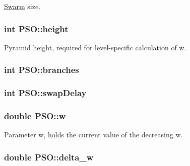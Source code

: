 \hyperlink{classSwarm}{Swarm} size. 

\hypertarget{classPSO_11d390b01da4feb9669afd003cf13288}{
\subsubsection{\setlength{\rightskip}{0pt plus 5cm}int {\bf PSO::height}}}
\label{classPSO_11d390b01da4feb9669afd003cf13288}


Pyramid height, required for level-specific calculation of w. 

\hypertarget{classPSO_242f4b5836cf0c00d23ecdf63197fcce}{
\subsubsection{\setlength{\rightskip}{0pt plus 5cm}int {\bf PSO::branches}}}
\label{classPSO_242f4b5836cf0c00d23ecdf63197fcce}


\hypertarget{classPSO_2ff776549b60a99977bbe046db3475cf}{
\subsubsection{\setlength{\rightskip}{0pt plus 5cm}int {\bf PSO::swapDelay}}}
\label{classPSO_2ff776549b60a99977bbe046db3475cf}


\hypertarget{classPSO_f4b142189309f79f9d7ef99930b5bebf}{
\subsubsection{\setlength{\rightskip}{0pt plus 5cm}double {\bf PSO::w}}}
\label{classPSO_f4b142189309f79f9d7ef99930b5bebf}


Parameter w, holds the current value of the decreasing w. 

\hypertarget{classPSO_87a3ee55a0e0cc8a84364d279ab1852b}{
\subsubsection{\setlength{\rightskip}{0pt plus 5cm}double {\bf PSO::delta\_\-w}}}
\label{classPSO_87a3ee55a0e0cc8a84364d279ab1852b}


